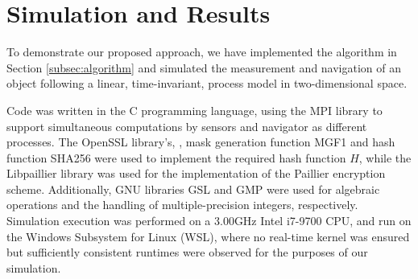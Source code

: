 \documentclass[10pt,letterpaper,oneside,twocolumn,journal]{IEEEtran}
\theoremstyle{definition}
\theoremstyle{definition}
\theoremstyle{remark}
\begin{document}
\section{Simulation and Results} \label{sec:sim_and_results}
To demonstrate our proposed approach, we have implemented the algorithm in Section \ref{subsec:algorithm} and simulated the measurement and navigation of an object following a linear, time-invariant, process model in two-dimensional space. 

Code was written in the C programming language, using the MPI library \cite{theopenmpiprojectOpenMPI2020} to support simultaneous computations by sensors and navigator as different processes. The OpenSSL library's, \cite{theopensslprojectOpenSSL2020}, mask generation function MGF1 and hash function SHA256 were used to implement the required hash function $H$, while the Libpaillier library \cite{bethencourtLibpaillier2010} was used for the implementation of the Paillier encryption scheme. Additionally, GNU libraries GSL \cite{thegsldevelopmentteamGSLGNUScientific2019} and GMP \cite{granlundGMPGNUMultiple2020} were used for algebraic operations and the handling of multiple-precision integers, respectively. Simulation execution was performed on a 3.00GHz Intel i7-9700 CPU, and run on the Windows Subsystem for Linux (WSL), where no real-time kernel was ensured but sufficiently consistent runtimes were observed for the purposes of our simulation.
\end{document}
